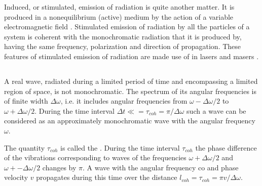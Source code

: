 Induced, or stimulated, emission of radiation is quite
another matter. It is produced in a nonequilibrium (active)
medium by the action of a variable electromagnetic field . Stimulated emission of radiation by all the particles of a system is coherent with the monochromatic radiation that it is produced by, having the same frequency, polarization and direction of propagation. These features of stimulated emission of radiation are made use of in lasers and masers .

\subsection{}\label{32.1.4} A real wave, radiated during a limited period of time and encompassing a limited region of space, is not monochromatic. The spectrum of its angular frequencies  is of finite width $\Delta \omega$, i.e. it includes angular frequencies from $ \omega - \Delta  \omega/2$ to $ \omega + \Delta  \omega/2$. During the time interval $\Delta t \ll = \tau_{coh} = \pi/ \Delta \omega$
such a wave can be considered as an approximately monochromatic wave with the angular frequency $\omega$. 

The quantity $\tau_{coh}$ is called the . During the time interval $\tau_{coh}$ the phase difference of the vibrations corresponding to waves of the frequencies $ \omega + \Delta  \omega/2$ and $ \omega +-\Delta  \omega/2$ changes by $\pi$. A wave with the angular frequency co and phase velocity $v$ propagates during this time over the distance $l_{coh} =  \tau_{coh} = \pi v/\Delta \omega$.

